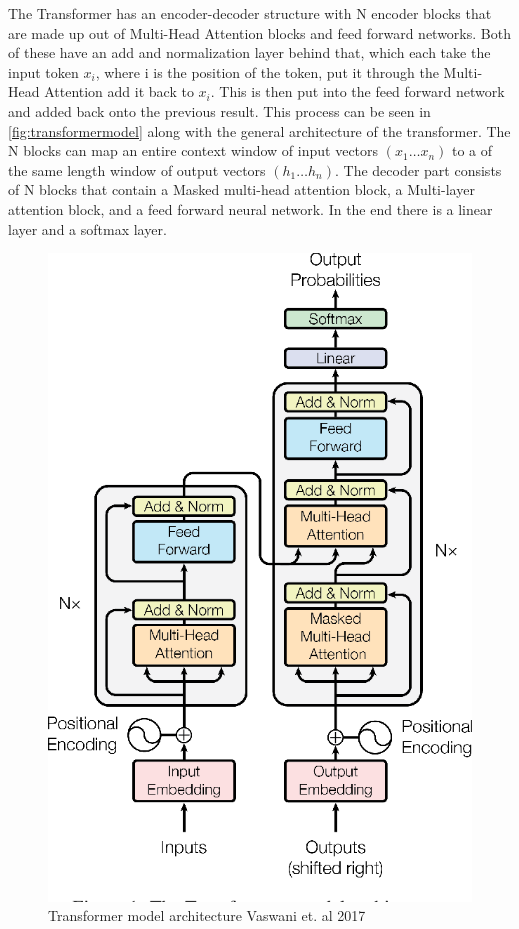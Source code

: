 The Transformer has an encoder-decoder structure with N encoder blocks that are made up out of Multi-Head Attention blocks and feed forward networks. Both of these have an add and normalization layer behind that, which each take the input token $x_i$, where i is the position of the token, put it through the Multi-Head Attention add it back to $x_i$. This is then put into the feed forward network and added back onto the previous result. This process can be seen in \autoref{fig:transformermodel} along with the general architecture of the transformer. 
The N blocks can map an entire context window of input vectors $(x_1\dots x_n)$ to a of the same length window of output vectors $(h_1\dots h_n)$. 
The decoder part consists of N blocks that contain a Masked multi-head attention block, a Multi-layer attention block, and a feed forward neural network. In the end there is a linear layer and a softmax layer. \cite[chapter~9]{jm3}

\begin{figure}[ht]
        \centering%
        \includegraphics[width=0.5\linewidth]{Latex//sections//images/transformermodel.png}
        \caption{Transformer model architecture Vaswani et. al 2017}
        \label{fig:transformermodel}
    \end{figure}


